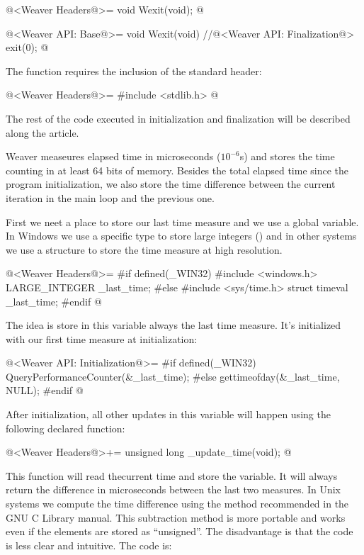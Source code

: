 \iniciocodigo
@<Weaver Headers@>=
void Wexit(void);
@
\fimcodigo

\iniciocodigo
@<Weaver API: Base@>=
void Wexit(void){
  //@<Weaver API: Finalization@>
  exit(0);
}
@
\fimcodigo

The  function requires the inclusion of the standard
header:

\iniciocodigo
@<Weaver Headers@>=
#include <stdlib.h>
@
\fimcodigo

The rest of the code executed in initialization and finalization will
be described along the article.


Weaver measeures elapsed time in microseconds ($10^{-6}$s) and stores
the time counting in at least 64 bits of memory. Besides the total
elapsed time since the program initialization, we also store the time
difference between the current iteration in the main loop and the
previous one.

First we neet a place to store our last time measure and we use a
global variable. In Windows we use a specific type to store large
integers () and in other systems we use a
 structure to store the time measure at high
resolution.


\iniciocodigo
@<Weaver Headers@>=
#if defined(_WIN32)
#include <windows.h>
LARGE_INTEGER _last_time;
#else
#include <sys/time.h>
struct timeval _last_time;
#endif
@
\fimcodigo

The idea is store in this variable always the last time measure. It's
initialized with our first time measure at initialization:

\iniciocodigo
@<Weaver API: Initialization@>=
#if defined(_WIN32)
QueryPerformanceCounter(&_last_time);
#else
gettimeofday(&_last_time, NULL);
#endif
@
\fimcodigo

After initialization, all other updates in this variable will happen
using the following declared function:

\iniciocodigo
@<Weaver Headers@>+=
unsigned long _update_time(void);
@
\fimcodigo

This function will read thecurrent time and store the variable. It
will always return the difference in microseconds between the last two
measures. In Unix systems we compute the time difference using the
method recommended in the GNU C Library manual. This subtraction
method is more portable and works even if the 
elements are stored as ``unsigned''. The disadvantage is that the code
is less clear and intuitive. The code is:


